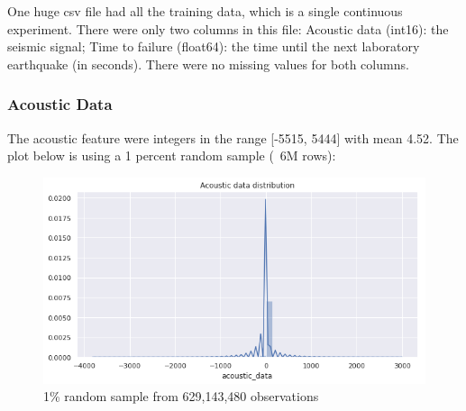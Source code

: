 \documentclass[]{llncs}
\begin{document}
One huge csv file had all the training data, which is a single continuous experiment. There were only two columns in this file:
Acoustic data (int16): the seismic signal; Time to failure (float64): the time until the next laboratory earthquake (in seconds). There were no missing values for both columns. \par

\subsubsection{Acoustic Data}
The acoustic feature were integers in the range [-5515, 5444] with mean 4.52. The plot below is using a 1 percent random sample (~6M rows):
\begin{figure}[h]
	\centering
	\includegraphics[width=0.7\linewidth]{../GPUProject/acousticFeatureIntegers}
	\caption[]{1\% random sample from 629,143,480 observations}
	\label{fig:acousticfeatureintegers}
\end{figure}
\end{document}
